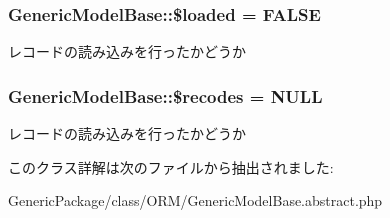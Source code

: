 \subsubsection[{\$loaded}]{\setlength{\rightskip}{0pt plus 5cm}Generic\+Model\+Base\+::\$loaded = F\+A\+L\+S\+E}\label{class_generic_model_base_a65d3d162749afd4b2417533e5beb95d2}
レコードの読み込みを行ったかどうか \hypertarget{class_generic_model_base_af08193258198675a2682be58dda93cd9}{}
\subsubsection[{\$recodes}]{\setlength{\rightskip}{0pt plus 5cm}Generic\+Model\+Base\+::\$recodes = N\+U\+L\+L}\label{class_generic_model_base_af08193258198675a2682be58dda93cd9}
レコードの読み込みを行ったかどうか 

このクラス詳解は次のファイルから抽出されました\+:\begin{DoxyCompactItemize}
\item 
Generic\+Package/class/\+O\+R\+M/Generic\+Model\+Base.\+abstract.\+php\end{DoxyCompactItemize}
